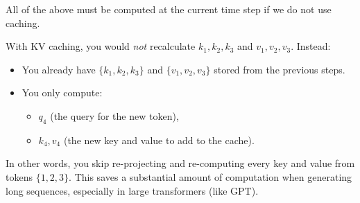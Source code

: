 All of the above must be computed at the current time step if we do not use caching.

With KV caching, you would \emph{not} recalculate \(k_1, k_2, k_3\) and \(v_1, v_2, v_3\). Instead:

\begin{itemize}
	\item You already have \(\{k_1, k_2, k_3\}\) and \(\{v_1, v_2, v_3\}\) stored from the previous steps.  
	\item You only compute:
		\begin{itemize}
			\item \(q_4\) (the query for the new token),
			\item \(k_4, v_4\) (the new key and value to add to the cache).  
		\end{itemize}
\end{itemize}
In other words, you skip re-projecting and re-computing every key and value from tokens \(\{1,2,3\}\). This saves a substantial amount of computation when generating long sequences, especially in large transformers (like GPT).

